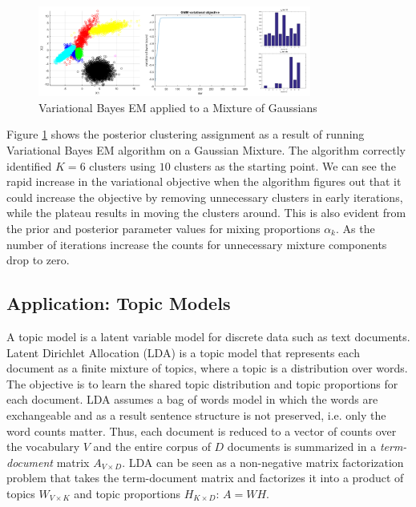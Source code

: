 \begin{figure}[tbhp]
    \centering
    \includegraphics[width=0.8\textwidth, trim={10 10 10 10}]{figures/vb_gmm.png}
    \caption{Variational Bayes EM applied to a Mixture of Gaussians}
    \label{fig:vb_gmm}
\end{figure}

Figure \ref{fig:vb_gmm} shows the posterior clustering assignment as a result of running Variational Bayes EM algorithm on a Gaussian Mixture. The algorithm correctly identified $K=6$ clusters using $10$ clusters as the starting point. We can see the rapid increase in the variational objective when the algorithm figures out that it could increase the objective by removing unnecessary clusters in early iterations, while the plateau results in moving the clusters around. This is also evident from the prior and posterior parameter values for mixing proportions $\alpha_k$. As the number of iterations increase the counts for unnecessary mixture components drop to zero. 

\subsection{Application: Topic Models}

A topic model is a latent variable model for discrete data such as text documents. Latent Dirichlet Allocation (LDA) is a topic model that represents each document as a finite mixture of topics, where a topic is a distribution over words. The objective is to learn the shared topic distribution and topic proportions for each document. LDA assumes a bag of words model in which the words are exchangeable and as a result sentence structure is not preserved, i.e. only the word counts matter. Thus, each document is reduced to a vector of counts over the vocabulary $V$ and the entire corpus of $D$ documents is summarized in a \textit{term-document} matrix $A_{V\times D}$. LDA can be seen as a non-negative matrix factorization problem that takes the term-document matrix and factorizes it into a product of topics $W_{V\times K}$ and topic proportions $H_{K\times D}$: $A = WH$.\\

